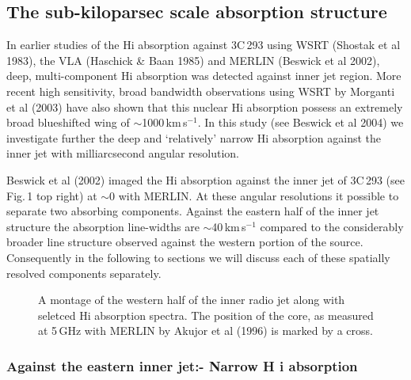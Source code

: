 \documentclass{evn2004}
\begin{document}
\subsection{The sub-kiloparsec scale absorption structure}

In earlier studies of the H{\sc i} absorption against 3C\,293 using WSRT (Shostak et
al 1983), the VLA (Haschick \& Baan 1985) and MERLIN (Beswick et al
2002), deep, multi-component H{\sc i} absorption was detected against
inner jet region. More recent high sensitivity, broad
bandwidth observations using WSRT by Morganti et al (2003) have also
shown that this nuclear H{\sc i} absorption possess an extremely broad
blueshifted wing of $\sim$1000\,km\,s$^{-1}$. In this study (see
Beswick et al 2004) we investigate further the deep and `relatively'
narrow H{\sc i} absorption against the inner jet with milliarcsecond
angular resolution. 

Beswick et al (2002) imaged the H{\sc i} absorption against the inner
jet of 3C\,293 (see Fig.\,1 top right) at $\sim$0 with
MERLIN. At these angular resolutions it possible to separate two
absorbing components. Against the eastern half of the inner jet
structure the absorption line-widths are $\sim$40\,km\,s$^{-1}$
compared to the considerably broader line structure observed against
the western portion of the source. Consequently in the following to
sections we will discuss each of these spatially resolved components separately.  
\begin{figure*}
   \centering
   \vspace{407pt}
      \caption{A montage of the western half of the inner radio jet
along with seletced H{\sc i} absorption spectra. The position of the
core, as measured at 5\,GHz with MERLIN by Akujor et al (1996) is
marked by a cross.
         \label{fig2}
         }
   \end{figure*}

\subsubsection{Against the eastern inner jet:- Narrow H{\sc
i} absorption}
\end{document}

